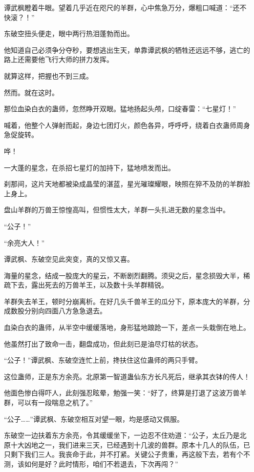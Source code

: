 \begin{this_body}
谭武枫瞪着牛眼。望着几乎近在咫尺的羊群，心中焦急万分，爆粗口喊道：“还不快滚？！”

东破空扭头便走，眼中两行热泪蓬勃而出。

他知道自己必须争分夺秒，要想逃出生天，单靠谭武枫的牺牲还远远不够，逃亡的路上还需要他飞行大师的拼力发挥。

就算这样，把握也不到三成。

然而。就在这时。

那位血染白衣的蛊师，忽然睁开双眼。猛地扬起头颅，口绽春雷：“七星灯！”

喊着，他整个人弹射而起，身边七团灯火，颜色各异，呼呼呼，绕着白衣蛊师周身急促旋转。

哗！

一大蓬的星念，在杀招七星灯的加持下，猛地喷发而出。

刹那间，这片天地都被染成晶莹的湛蓝，星光璀璨耀眼，映照在猝不及防的羊群脸上身上。

盘山羊群的万兽王惊惶高叫，但惯性太大，羊群一头扎进无数的星念当中。

“公子！”

“余亮大人！”

谭武枫、东破空见此突变，真的又惊又喜。

海量的星念，结成一股庞大的星云，不断剧烈翻腾。须臾之后，星念损毁大半，稀疏下去，露出死去的万兽羊王，以及数十头羊群精锐。

羊群失去羊王，顿时分崩离析。在好几头千兽羊王的瓜分下，原本庞大的羊群，分成数股分别向四面八方急急退去。

血染白衣的蛊师，从半空中缓缓落地，身形猛地踉跄一下，差点一头栽倒在地上。

他虽然打出了致命一击，翻盘成功，但此刻已是油尽灯枯的状态。

“公子！”谭武枫、东破空连忙上前，搀扶住这位蛊师的两只手臂。

这位蛊师，正是东方余亮。北原第一智道蛊仙东方长凡死后，继承其衣钵的传人！

他面色惨白得吓人，此刻强忍眩晕，勉强一笑：“好了，终算是打退了这波万兽羊群，可以有一段喘息之机了。”

“公子……”谭武枫、东破空相互对望一眼，均是感动又佩服。

东破空一边扶着东方余亮，令其缓缓坐下，一边忍不住劝道：“公子，太丘乃是北原十大凶地之一，我们进来三天，已经遇到十几波的兽群。原本十几人的队伍，已只剩下我们三人。我丧命于此，并不打紧。关键公子贵重，再这般下去，若有个不测，该如何是好？此时情形，咱们不若退去，下次再闯？”


\end{this_body}
